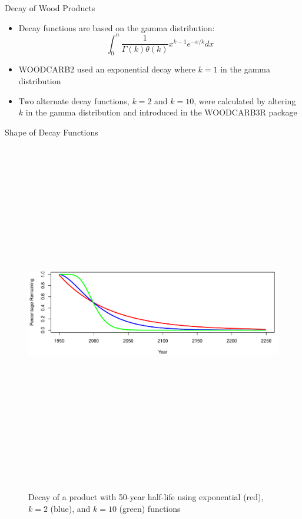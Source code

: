 \documentclass[final]{beamer}\usepackage[]{graphicx}\usepackage[]{color}
\newlength{\onecolwid}
\newlength{\twocolwid}
\begin{document}
\begin{frame}[t]
\begin{columns}[t]
\begin{column}{\twocolwid}
\begin{columns}[t,totalwidth=\twocolwid]
\begin{column}{\onecolwid}
\begin{block}{Decay of Wood Products}
\begin{itemize}
\item Decay functions are based on the gamma distribution:
$$\int_{0}^{n}\frac{1}{\Gamma(k)\theta(k)}x^{k-1}e^{-x/k}dx$$
\item WOODCARB2 used an exponential decay where $k=1$ in the gamma distribution
\item Two alternate decay functions, $k=2$ and $k=10$, were calculated by altering $k$ in the gamma distribution and introduced in the WOODCARB3R package
\end{itemize}
\end{block}
\begin{block}{Shape of Decay Functions}
\begin{center}
\vspace{-2cm}
\begin{figure}
    {\includegraphics[width=1\linewidth, height=15cm]{DecayPlotExample.pdf}}
    \caption{Decay of a product with 50-year half-life using exponential (red), $k=2$ (blue), and $k=10$ (green) functions}
\end{figure}
\end{center}


\end{block}
\end{column}
\end{columns}
\end{column}
\end{columns}
\end{frame}
\end{document}
